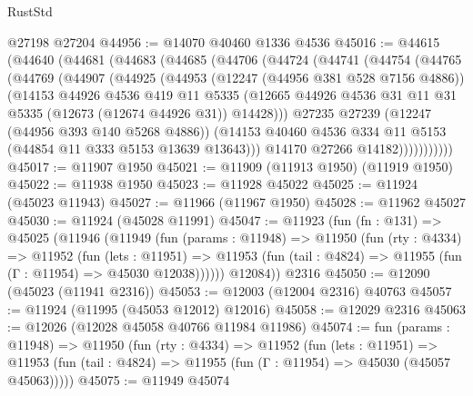 \begin{lexlean}{RustStd}
\begin{coremodule}
    @27198
    @27204
@44956 := @14070 @40460 @1336 @4536
@45016 := @44615
    (@44640
      (@44681
        (@44683
          (@44685
            (@44706
              (@44724
                (@44741
                  (@44754
                    (@44765
                      (@44769
                        (@44907
                          (@44925
                            (@44953
                              (@12247 (@44956 @381 @528 @7156 @4886))
                              (@14153
                                @44926
                                @4536
                                @419
                                @11
                                @5335
                                (@12665
                                  @44926
                                  @4536
                                  @31
                                  @11
                                  @31
                                  @5335
                                  (@12673 (@12674 @44926 @31))
                                  @14428)))
                            @27235
                            @27239
                            (@12247 (@44956 @393 @140 @5268 @4886))
                            (@14153
                              @40460
                              @4536
                              @334
                              @11
                              @5153
                              (@44854 @11 @333 @5153 @13639 @13643)))
                          @14170
                          @27266
                          @14182)))))))))))
@45017 := @11907 @1950
@45021 := @11909 (@11913 @1950) (@11919 @1950)
@45022 := @11938 @1950
@45023 := @11928 @45022
@45025 := @11924 (@45023 @11943)
@45027 := @11966 (@11967 @1950)
@45028 := @11962 @45027
@45030 := @11924 (@45028 @11991)
@45047 := @11923
    (fun (fn : @131) =>
    @45025
      (@11946
        (@11949
          (fun (params : @11948) =>
          @11950
            (fun (rty : @4334) =>
            @11952
              (fun (lets : @11951) =>
              @11953 (fun (tail : @4824) => @11955 (fun (Γ : @11954) => @45030 @12038))))))
        @12084))
    @2316
@45050 := @12090 (@45023 (@11941 @2316))
@45053 := @12003 (@12004 @2316) @40763
@45057 := @11924 (@11995 (@45053 @12012) @12016)
@45058 := @12029 @2316
@45063 := @12026 (@12028 @45058 @40766 @11984 @11986)
@45074 := fun (params : @11948) =>
  @11950
    (fun (rty : @4334) =>
    @11952
      (fun (lets : @11951) =>
      @11953 (fun (tail : @4824) => @11955 (fun (Γ : @11954) => @45030 (@45057 @45063)))))
@45075 := @11949 @45074

\end{coremodule}
\end{lexlean}
